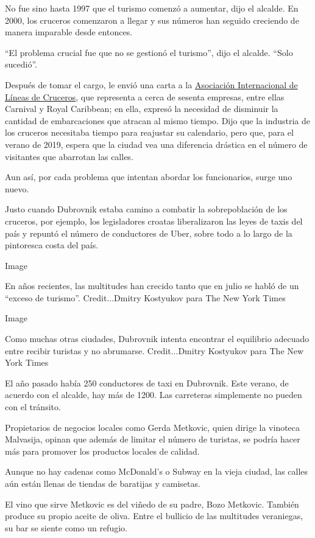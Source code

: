 No fue sino hasta 1997 que el turismo comenzó a aumentar, dijo el
alcalde. En 2000, los cruceros comenzaron a llegar y sus números han
seguido creciendo de manera imparable desde entonces.

``El problema crucial fue que no se gestionó el turismo'', dijo el
alcalde. ``Solo sucedió''.

Después de tomar el cargo, le envió una carta a la
\href{https://es.cruiseexperts.org/}{Asociación Internacional de Líneas
de Cruceros}, que representa a cerca de sesenta empresas, entre ellas
Carnival y Royal Caribbean; en ella, expresó la necesidad de disminuir
la cantidad de embarcaciones que atracan al mismo tiempo. Dijo que la
industria de los cruceros necesitaba tiempo para reajustar su
calendario, pero que, para el verano de 2019, espera que la ciudad vea
una diferencia drástica en el número de visitantes que abarrotan las
calles.

Aun así, por cada problema que intentan abordar los funcionarios, surge
uno nuevo.

Justo cuando Dubrovnik estaba camino a combatir la sobrepoblación de los
cruceros, por ejemplo, los legisladores croatas liberalizaron las leyes
de taxis del país y repuntó el número de conductores de Uber, sobre todo
a lo largo de la pintoresca costa del país.

Image

En años recientes, las multitudes han crecido tanto que en julio se
habló de un ``exceso de turismo''. Credit...Dmitry Kostyukov para The
New York Times

Image

Como muchas otras ciudades, Dubrovnik intenta encontrar el equilibrio
adecuado entre recibir turistas y no abrumarse. Credit...Dmitry
Kostyukov para The New York Times

El año pasado había 250 conductores de taxi en Dubrovnik. Este verano,
de acuerdo con el alcalde, hay más de 1200. Las carreteras simplemente
no pueden con el tránsito.

Propietarios de negocios locales como Gerda Metkovic, quien dirige la
vinoteca Malvasija, opinan que además de limitar el número de turistas,
se podría hacer más para promover los productos locales de calidad.

Aunque no hay cadenas como McDonald's o Subway en la vieja ciudad, las
calles aún están llenas de tiendas de baratijas y camisetas.

El vino que sirve Metkovic es del viñedo de su padre, Bozo Metkovic.
También produce su propio aceite de oliva. Entre el bullicio de las
multitudes veraniegas, su bar se siente como un refugio.

